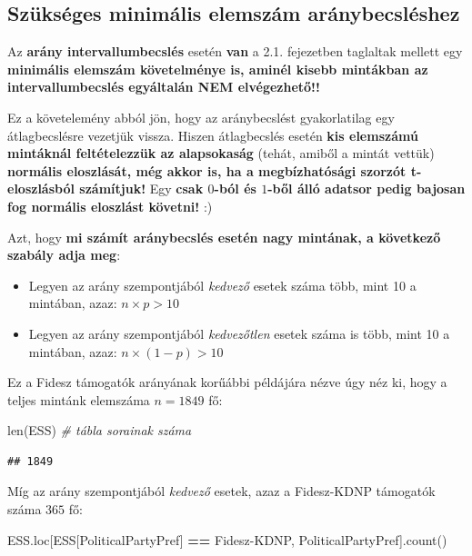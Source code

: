 \documentclass[
]{book}
\newenvironment{Shaded}{\begin{snugshade}}{\end{snugshade}}
\newcommand{\BuiltInTok}[1]{#1}
\newcommand{\CommentTok}[1]{\textcolor[rgb]{0.56,0.35,0.01}{\textit{#1}}}
\newcommand{\NormalTok}[1]{#1}
\newcommand{\OperatorTok}[1]{\textcolor[rgb]{0.81,0.36,0.00}{\textbf{#1}}}
\newcommand{\StringTok}[1]{\textcolor[rgb]{0.31,0.60,0.02}{#1}}
\providecommand{\tightlist}{%
  \setlength{\itemsep}{0pt}\setlength{\parskip}{0pt}}
\begin{document}
\subsection{Szükséges minimális elemszám aránybecsléshez}\label{szuxfcksuxe9ges-minimuxe1lis-elemszuxe1m-aruxe1nybecsluxe9shez}

Az \textbf{arány intervallumbecslés} esetén \textbf{van} a 2.1. fejezetben taglaltak mellett egy \textbf{minimális elemszám követelménye is, aminél kisebb mintákban az intervallumbecslés egyáltalán NEM elvégezhető!!}

Ez a követelemény abból jön, hogy az aránybecslést gyakorlatilag egy átlagbecslésre vezetjük vissza.
Hiszen átlagbecslés esetén \textbf{kis elemszámú mintáknál feltételezzük az alapsokaság} (tehát, amiből a mintát vettük) \textbf{normális eloszlását, még akkor is, ha a megbízhatósági szorzót t-eloszlásból számítjuk!} Egy \textbf{csak \(0\)-ból és \(1\)-ből álló adatsor pedig bajosan fog normális eloszlást követni!} :)

Azt, hogy \textbf{mi számít aránybecslés esetén nagy mintának, a következő szabály adja meg}:

\begin{itemize}
\tightlist
\item
  Legyen az arány szempontjából \emph{kedvező} esetek száma több, mint 10 a mintában, azaz: \(n \times p >10\)
\item
  Legyen az arány szempontjából \emph{kedvezőtlen} esetek száma is több, mint 10 a mintában, azaz: \(n \times (1-p) >10\)
\end{itemize}

Ez a Fidesz támogatók arányának korűábbi példájára nézve úgy néz ki, hogy a teljes mintánk elemszáma \(n=1849\) fő:

\begin{Shaded}
\begin{Highlighting}[]
\BuiltInTok{len}\NormalTok{(ESS) }\CommentTok{\# tábla sorainak száma}
\end{Highlighting}
\end{Shaded}

\begin{verbatim}
## 1849
\end{verbatim}

Míg az arány szempontjából \emph{kedvező} esetek, azaz a Fidesz-KDNP támogatók száma \(365\) fő:

\begin{Shaded}
\begin{Highlighting}[]
\NormalTok{ESS.loc[ESS[}\StringTok{\textquotesingle{}PoliticalPartyPref\textquotesingle{}}\NormalTok{] }\OperatorTok{==} \StringTok{\textquotesingle{}Fidesz{-}KDNP\textquotesingle{}}\NormalTok{, }\StringTok{\textquotesingle{}PoliticalPartyPref\textquotesingle{}}\NormalTok{].count()}
\end{Highlighting}
\end{Shaded}
\end{document}
